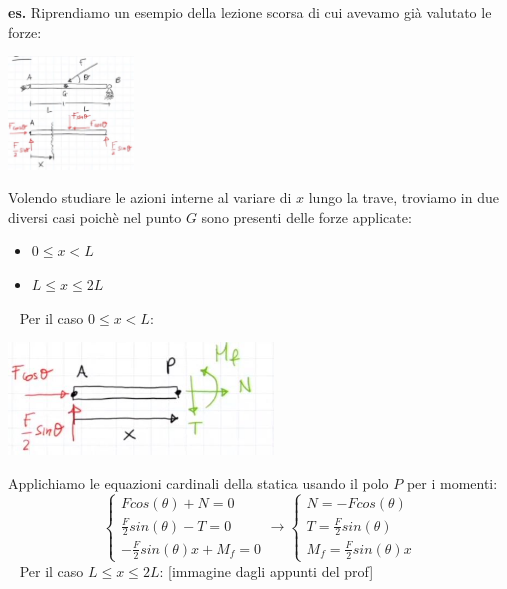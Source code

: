 \newline
\textbf{es.} Riprendiamo un esempio della lezione scorsa di cui avevamo già valutato le forze:
\begin{center}
    \includegraphics[height=3cm]{../lezione7/img9.JPG}
\end{center}
Volendo studiare le azioni interne al variare di $x$ lungo la trave, troviamo in due diversi casi poichè nel punto $G$ sono presenti delle forze applicate:
\begin{itemize}
    \item $0\leq x < L$
    \item $L\leq x \leq 2L$
\end{itemize}
\ \newline
Per il caso $0\leq x < L$:
\begin{center}
    \includegraphics[height=3cm]{../lezione7/img10.JPG}
\end{center}
Applichiamo le equazioni cardinali della statica usando il polo $P$ per i momenti:
\[
    \begin{cases}
        F cos(\theta) + N = 0\\
        \frac{F}{2} sin(\theta) - T = 0\\
        - \frac{F}{2} sin(\theta) x + M_f = 0
    \end{cases} \rightarrow  \begin{cases}
        N = - F cos(\theta)\\
        T = \frac{F}{2} sin(\theta)\\
        M_f = \frac{F}{2} sin(\theta) x
    \end{cases}
\]
\ \newline
Per il caso $L\leq x \leq 2L$:
[immagine dagli appunti del prof]
